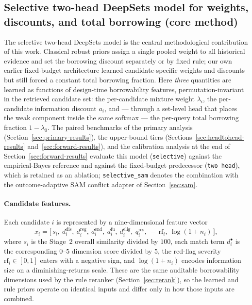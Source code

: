 \documentclass[11pt]{article}
\newcommand{\lamz}{\lambda_{0}}
\begin{document}
\subsection{Selective two-head DeepSets model for weights, discounts, and total borrowing (core method)}
\label{sec:twohead}
The selective two-head DeepSets model is the central methodological
contribution of this work. Classical robust priors assign a single pooled
weight to all historical evidence and set the borrowing discount separately or
by fixed rule; our own earlier fixed-budget architecture learned
candidate-specific weights and discounts but still forced a constant total
borrowing fraction. Here \emph{three} quantities are learned as functions of
design-time borrowability features, permutation-invariant in the retrieved
candidate set: the per-candidate mixture weight $\lambda_i$, the per-candidate
information discount $a_i$, and --- through a set-level head that places the
weak component inside the same softmax --- the per-query total borrowing
fraction $1-\lamz$. The paired
benchmarks of the primary analysis
(Section~\ref{sec:primary-results}), the upper-bound tiers
(Sections~\ref{sec:headtohead-results}
and~\ref{sec:forward-results}), and the calibration analysis at the end of
Section~\ref{sec:forward-results} evaluate this model (\texttt{selective}) against
the empirical-Bayes reference and against the fixed-budget predecessor
(\texttt{two\_head}), which is retained as an ablation; \texttt{selective\_sam}
denotes the combination with the outcome-adaptive SAM conflict adapter of
Section~\ref{sec:sam}.

\paragraph{Candidate features.} Each candidate $i$ is represented by a
nine-dimensional feature vector
\begin{equation}
x_i = \big[\, s_i,\ d^{\mathrm{dis}}_i,\ d^{\mathrm{reg}}_i,\ d^{\mathrm{end}}_i,\
d^{\mathrm{fu}}_i,\ d^{\mathrm{elig}}_i,\ q^{\mathrm{res}}_i,\
-\,\mathrm{rf}_i,\ \log(1+n_i) \,\big],
\end{equation}
where $s_i$ is the Stage~2 overall similarity divided by $100$, each match term
$d^{\bullet}_i$ is the corresponding $0$--$5$ dimension score divided by $5$,
the red-flag severity $\mathrm{rf}_i \in [0,1]$ enters with a negative sign, and
$\log(1+n_i)$ encodes information size on a diminishing-returns scale. These are
the same auditable borrowability dimensions used by the rule reranker
(Section~\ref{sec:rerank}), so the learned and rule priors operate on identical inputs and
differ only in how those inputs are combined.
\end{document}
